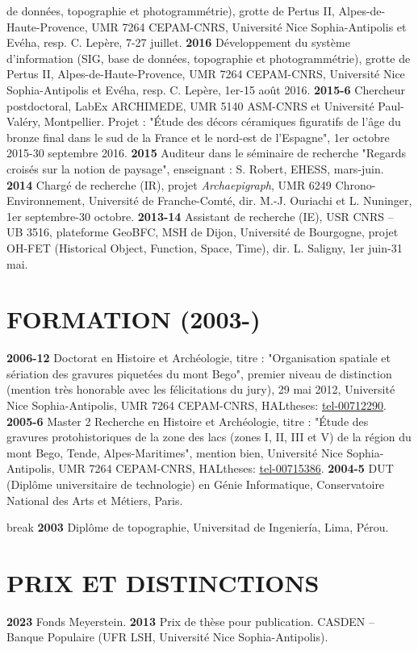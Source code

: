 \documentclass{article}
\begin{document}
 de données, topographie et photogrammétrie), grotte de Pertus II, Alpes-de-Haute-Provence, UMR 7264 CEPAM-CNRS, Université Nice Sophia-Antipolis et Evéha, resp. C. Lepère, 7-27 juillet.
\smallbreak
\textbf{2016 }Développement du système d'information (SIG, base de données, topographie et photogrammétrie), grotte de Pertus II, Alpes-de-Haute-Provence, UMR 7264 CEPAM-CNRS, Université Nice Sophia-Antipolis et Evéha, resp. C. Lepère, 1er-15 août 2016.
\smallbreak
\textbf{2015-6 }Chercheur postdoctoral, LabEx ARCHIMEDE, UMR 5140 ASM-CNRS et Université Paul-Valéry, Montpellier. Projet : "Étude des décors céramiques figuratifs de l'âge du bronze final dans le sud de la France et le nord-est de l'Espagne", 1er octobre 2015-30 septembre 2016.
\smallbreak
\textbf{2015 }Auditeur dans le séminaire de recherche "Regards croisés sur la notion de paysage", enseignant : S. Robert, EHESS, mars-juin.
\smallbreak
\textbf{2014 }Chargé de recherche (IR), projet \textit{Archaepigraph}, UMR 6249 Chrono-Environnement, Université de Franche-Comté, dir. M.-J. Ouriachi et L. Nuninger, 1er septembre-30 octobre.
\smallbreak
\textbf{2013-14 }Assistant de recherche (IE), USR CNRS -- UB 3516, plateforme GeoBFC, MSH de Dijon, Université de Bourgogne, projet OH-FET (Historical Object, Function, Space, Time), dir. L. Saligny, 1er juin-31 mai.

\section{FORMATION (2003-)}

\textbf{2006-12 }Doctorat en Histoire et Archéologie, titre : "Organisation spatiale et sériation des gravures piquetées du mont Bego", premier niveau de distinction (mention très honorable avec les félicitations du jury), 29 mai 2012, Université Nice Sophia-Antipolis, UMR 7264 CEPAM-CNRS, HALtheses: \href{https://tel.archives-ouvertes.fr/tel-00712290}{tel-00712290}.
\smallbreak
\textbf{2005-6 }Master 2 Recherche en Histoire et Archéologie, titre : "Étude des gravures protohistoriques de la zone des lacs (zones I, II, III et V) de la région du mont Bego, Tende, Alpes-Maritimes", mention bien, Université Nice Sophia-Antipolis, UMR 7264 CEPAM-CNRS, HALtheses: \href{https://tel.archives-ouvertes.fr/tel-00715386}{tel-00715386}.
\smallbreak
\textbf{2004-5 }DUT (Diplôme universitaire de technologie) en Génie Informatique, Conservatoire National des Arts et Métiers, Paris.
\small

break
\textbf{2003 }Diplôme de topographie, Universitad de Ingeniería, Lima, Pérou.

\section{PRIX ET DISTINCTIONS}

\textbf{2023 }Fonds Meyerstein.
\smallbreak
\textbf{2013 }Prix de thèse pour publication. CASDEN -- Banque Populaire (UFR LSH, Université Nice Sophia-Antipolis).
\end{document}
